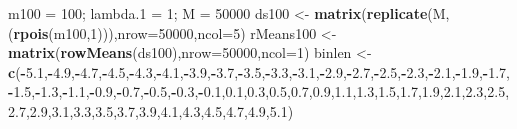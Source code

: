 \documentclass[
]{article}
\newenvironment{Shaded}{\begin{snugshade}}{\end{snugshade}}
\newcommand{\DataTypeTok}[1]{\textcolor[rgb]{0.13,0.29,0.53}{#1}}
\newcommand{\DecValTok}[1]{\textcolor[rgb]{0.00,0.00,0.81}{#1}}
\newcommand{\FloatTok}[1]{\textcolor[rgb]{0.00,0.00,0.81}{#1}}
\newcommand{\KeywordTok}[1]{\textcolor[rgb]{0.13,0.29,0.53}{\textbf{#1}}}
\newcommand{\NormalTok}[1]{#1}
\newcommand{\OperatorTok}[1]{\textcolor[rgb]{0.81,0.36,0.00}{\textbf{#1}}}
\newcommand{\StringTok}[1]{\textcolor[rgb]{0.31,0.60,0.02}{#1}}
\begin{document}
\begin{Shaded}
\begin{Highlighting}[]
\NormalTok{m100 =}\StringTok{ }\DecValTok{100}\NormalTok{; lambda}\FloatTok{.1}\NormalTok{ =}\StringTok{ }\DecValTok{1}\NormalTok{; M =}\StringTok{ }\DecValTok{50000}
\NormalTok{ds100 <-}\StringTok{ }\KeywordTok{matrix}\NormalTok{(}\KeywordTok{replicate}\NormalTok{(M,(}\KeywordTok{rpois}\NormalTok{(m100,}\DecValTok{1}\NormalTok{))),}\DataTypeTok{nrow=}\DecValTok{50000}\NormalTok{,}\DataTypeTok{ncol=}\DecValTok{5}\NormalTok{)}
\NormalTok{rMeans100 <-}\StringTok{ }\KeywordTok{matrix}\NormalTok{(}\KeywordTok{rowMeans}\NormalTok{(ds100),}\DataTypeTok{nrow=}\DecValTok{50000}\NormalTok{,}\DataTypeTok{ncol=}\DecValTok{1}\NormalTok{)}
\NormalTok{binlen <-}\StringTok{ }\KeywordTok{c}\NormalTok{(}\OperatorTok{-}\FloatTok{5.1}\NormalTok{,}\OperatorTok{-}\FloatTok{4.9}\NormalTok{,}\OperatorTok{-}\FloatTok{4.7}\NormalTok{,}\OperatorTok{-}\FloatTok{4.5}\NormalTok{,}\OperatorTok{-}\FloatTok{4.3}\NormalTok{,}\OperatorTok{-}\FloatTok{4.1}\NormalTok{,}\OperatorTok{-}\FloatTok{3.9}\NormalTok{,}\OperatorTok{-}\FloatTok{3.7}\NormalTok{,}\OperatorTok{-}\FloatTok{3.5}\NormalTok{,}\OperatorTok{-}\FloatTok{3.3}\NormalTok{,}\OperatorTok{-}\FloatTok{3.1}\NormalTok{,}\OperatorTok{-}\FloatTok{2.9}\NormalTok{,}\OperatorTok{-}\FloatTok{2.7}\NormalTok{,}\OperatorTok{-}\FloatTok{2.5}\NormalTok{,}\OperatorTok{-}\FloatTok{2.3}\NormalTok{,}\OperatorTok{-}\FloatTok{2.1}\NormalTok{,}\OperatorTok{-}\FloatTok{1.9}\NormalTok{,}\OperatorTok{-}\FloatTok{1.7}\NormalTok{,}\OperatorTok{-}\FloatTok{1.5}\NormalTok{,}\OperatorTok{-}\FloatTok{1.3}\NormalTok{,}\OperatorTok{-}\FloatTok{1.1}\NormalTok{,}\OperatorTok{-}\FloatTok{0.9}\NormalTok{,}\OperatorTok{-}\FloatTok{0.7}\NormalTok{,}\OperatorTok{-}\FloatTok{0.5}\NormalTok{,}\OperatorTok{-}\FloatTok{0.3}\NormalTok{,}\OperatorTok{-}\FloatTok{0.1}\NormalTok{,}\FloatTok{0.1}\NormalTok{,}\FloatTok{0.3}\NormalTok{,}\FloatTok{0.5}\NormalTok{,}\FloatTok{0.7}\NormalTok{,}\FloatTok{0.9}\NormalTok{,}\FloatTok{1.1}\NormalTok{,}\FloatTok{1.3}\NormalTok{,}\FloatTok{1.5}\NormalTok{,}\FloatTok{1.7}\NormalTok{,}\FloatTok{1.9}\NormalTok{,}\FloatTok{2.1}\NormalTok{,}\FloatTok{2.3}\NormalTok{,}\FloatTok{2.5}\NormalTok{,}\FloatTok{2.7}\NormalTok{,}\FloatTok{2.9}\NormalTok{,}\FloatTok{3.1}\NormalTok{,}\FloatTok{3.3}\NormalTok{,}\FloatTok{3.5}\NormalTok{,}\FloatTok{3.7}\NormalTok{,}\FloatTok{3.9}\NormalTok{,}\FloatTok{4.1}\NormalTok{,}\FloatTok{4.3}\NormalTok{,}\FloatTok{4.5}\NormalTok{,}\FloatTok{4.7}\NormalTok{,}\FloatTok{4.9}\NormalTok{,}\FloatTok{5.1}\NormalTok{)}

\end{Highlighting}
\end{Shaded}
\end{document}
